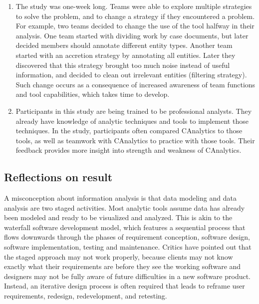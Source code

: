 \begin{enumerate}
\def\labelenumi{\arabic{enumi}.}
\tightlist
\item
  The study was one-week long. Teams were able to explore multiple
  strategies to solve the problem, and to change a strategy if they
  encountered a problem. For example, two teams decided to change the
  use of the tool halfway in their analysis. One team started with
  dividing work by case documents, but later decided members should
  annotate different entity types. Another team started with an
  accretion strategy by annotating all entities. Later they discovered
  that this strategy brought too much noise instead of useful
  information, and decided to clean out irrelevant entities (filtering
  strategy). Such change occurs as a consequence of increased awareness
  of team functions and tool capabilities, which takes time to develop.
\item
  Participants in this study are being trained to be professional
  analysts. They already have knowledge of analytic techniques and tools
  to implement those techniques. In the study, participants often
  compared CAnalytics to those tools, as well as teamwork with
  CAnalytics to practice with those tools. Their feedback provides more
  insight into strength and weakness of CAnalytics.
\end{enumerate}

\subsection{Reflections on result}\label{reflections-on-result}

A misconception about information analysis is that data modeling and
data analysis are two staged activities. Most analytic tools assume data
has already been modeled and ready to be visualized and analyzed. This
is akin to the waterfall software development model, which features a
sequential process that flows downwards through the phases of
requirement conception, software design, software implementation,
testing and maintenance. Critics have pointed out that the staged
approach may not work properly, because clients may not know exactly
what their requirements are before they see the working software and
designers may not be fully aware of future difficulties in a new
software product. Instead, an iterative design process is often required
that leads to reframe user requirements, redesign, redevelopment, and
retesting.

